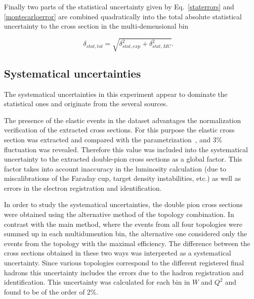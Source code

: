 \documentclass[prc,twocolumn,superscriptaddress,showpacs,amssymb,amsmath,amsfonts,linenumbers,aps]{revtex4-1}
\begin{document}
Finally two parts of the statistical uncertainty given by Eq.~\eqref{staterrors} and \eqref{montecarloerror} are combined quadratically into the total absolute statistical uncertainty to the cross section in the multi-demensional bin


\begin{equation}
\delta_{stat,tot} =
\sqrt{\delta_{stat,exp}^{2} + \delta_{stat,MC}^{2}}.
\label{errortot}
\end{equation}











\subsection{Systematical uncertainties}

The systematical uncertainties in this experiment appear to dominate the statistical ones and originate from the several sources.

The presence of the elastic events
in the dataset advantages the normalization verification of the extracted cross sections. For this purpose the elastic cross section was extracted and compared with the parametrization~\cite{Bosted:1994tm}, and 3\% fluctuation was revealed. Therefore this value was included into the systematical uncertainty  to the extracted double-pion cross sections as a global factor. This factor takes into account  inaccuracy in the luminosity calculation (due to miscalibrations of the Faraday cup, target
density instabilities, etc.) as well as errors in the electron registration and identification.


In order to study the systematical uncertainties, the double pion cross sections were obtained using the alternative method of the topology combination. In contrast with the main method, where the events from all four topologies were summed up in each multidumention bin, the alternative one considered only the events from the topology with the maximal efficiency. 
 The difference between the cross sections obtained in these two ways was interpreted as a systematical uncertainty.
Since various topologies correspond to the different registered final hadrons  this uncertainty includes the errors due to the hadron registration and identification. 
This uncertainty was calculated for each bin in  $W$ and $Q^{2}$ and found to be of the order of 2\%.
\end{document}
